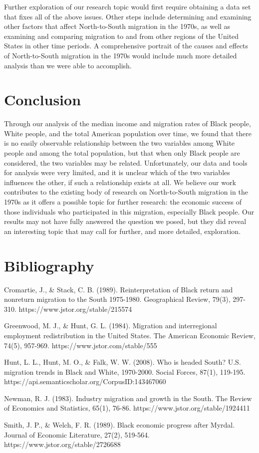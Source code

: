 \documentclass[12pt]{article}
\begin{document}
Further exploration of our research topic would first require obtaining a data set that fixes all of the above issues. Other steps include determining and examining other factors that affect North-to-South migration in the 1970s, as well as examining and comparing migration to and from other regions of the United States in other time periods. A comprehensive portrait of the causes and effects of North-to-South migration in the 1970s would include much more detailed analysis than we were able to accomplish. 

\section{Conclusion}
\label{sec:conclusion}

Through our analysis of the median income and migration rates of Black people, White people, and the total American population over time, we found that there is no easily observable relationship between the two variables among White people and among the total population, but that when only Black people are considered, the two variables may be related. Unfortunately, our data and tools for analysis were very limited, and it is unclear which of the two variables influences the other, if such a relationship exists at all. We believe our work contributes to the existing body of research on North-to-South migration in the 1970s as it offers a possible topic for further research: the economic success of those individuals who participated in this migration, especially Black people. Our results may not have fully answered the question we posed, but they did reveal an interesting topic that may call for further, and more detailed, exploration. 

\newpage
\section*{Bibliography}
\singlespacing
\setlength\bibsep{0pt}

Cromartie, J., \& Stack, C. B. (1989). Reinterpretation of Black return and nonreturn migration to the South 1975-1980. Geographical Review, 79(3), 297-310. https://www.jstor.org/stable/215574 

Greenwood, M. J., \& Hunt, G. L. (1984). Migration and interregional employment redistribution in the United States. The American Economic Review, 74(5), 957-969. https://www.jstor.com/stable/555 

Hunt, L. L., Hunt, M. O., \& Falk, W. W. (2008). Who is headed South? U.S. migration trends in Black and White, 1970-2000. Social Forces, 87(1), 119-195. https://api.semanticscholar.org/CorpusID:143467060 

Newman, R. J. (1983). Industry migration and growth in the South. The Review of Economics and Statistics, 65(1), 76-86. https://www.jstor.org/stable/1924411 

Smith, J. P., \& Welch, F. R. (1989). Black economic progress after Myrdal. Journal of Economic Literature, 27(2), 519-564. https://www.jstor.org/stable/2726688 
\end{document}
